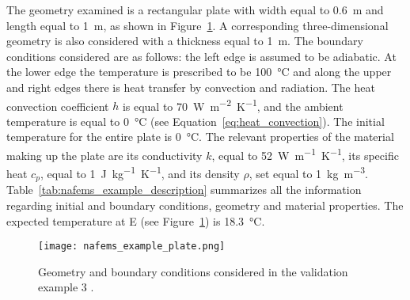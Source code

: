 The geometry examined is a rectangular plate with width equal to \SI{0.6}{\meter} and length equal to \SI{1}{\meter}, as shown in Figure~\ref{fig:nafems_example_plate}.
A corresponding three-dimensional geometry is also considered with a thickness equal to \SI{1}{\meter}.
The boundary conditions considered are as follows: the left edge is assumed to be adiabatic.
At the lower edge the temperature is prescribed to be \SI{100}{\celsius} and along the upper and right edges there is heat transfer by convection and radiation.
The heat convection coefficient \(h\) is equal to \SI{70}{\watt\meter^{-2}\kelvin^{-1}}, and the ambient temperature is equal to \SI{0}{\celsius} (see Equation~\ref{eq:heat_convection}).
The initial temperature for the entire plate is \SI{0}{\celsius}.
The relevant properties of the material making up the plate are its conductivity \(k\), equal to \SI{52}{\watt\meter^{-1}\kelvin^{-1}}, its specific heat \(c_p\), equal to \SI{1}{\joule\kilo\gram^{-1}\kelvin^{-1}}, and its density \(\rho\), set equal to \SI{1}{\kilo\gram\meter^{-3}}.
Table~\ref{tab:nafems_example_description} summarizes all the information regarding initial and boundary conditions, geometry and material properties.
The expected temperature at E (see Figure~\ref{fig:nafems_example_plate}) is \SI{18.3}{\celsius}.


\begin{figure}
  \centering
  \texttt{[image: nafems\_example\_plate.png]}
  \caption{Geometry and boundary conditions considered in the validation example 3 \citep{NAFEMSbenchmarks}.}
\label{fig:nafems_example_plate}
\end{figure}

